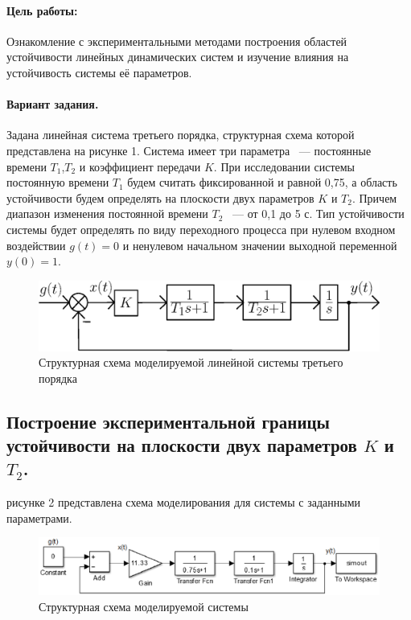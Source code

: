 \documentclass[12pt,a4paper]{article}
\begin{document}


\paragraph{Цель работы:}Ознакомление с экспериментальными методами построения областей устойчивости линейных динамических систем и изучение влияния на устойчивость системы её параметров.%
\paragraph{Вариант задания.} Задана линейная система третьего порядка, структурная схема которой представлена на рисунке 1. Система имеет три параметра ~--- постоянные времени $T_1$,$T_2$ и коэффициент передачи $K$. При исследовании системы постоянную времени $T_1$ будем считать фиксированной и равной 0,75, а область устойчивости будем определять на плоскости двух параметров $K$ и $T_2$. Причем диапазон изменения постоянной времени $T_2$ ~--- от 0,1 до 5 с. Тип устойчивости системы будет определять по виду переходного процесса при нулевом входном воздействии $g(t)=0$ и ненулевом начальном значении выходной переменной $y(0)=1$.
\begin{figure}[h!]
	\centering
	\includegraphics[width=0.8\linewidth]{cxema1.eps}
	\caption{Структурная схема моделируемой линейной системы третьего порядка}
\end{figure} 

\newpage
\begin{center}
    \section{Построение экспериментальной границы устойчивости на плоскости двух параметров $K$ и $T_2$.}
\end{center}
 рисунке 2 представлена схема моделирования для системы с заданными параметрами.
\begin{figure}[h!]
	\centering
	\includegraphics[width=0.9\linewidth]{cxema2.eps}
	\caption{Структурная схема моделируемой системы}
\end{figure}
 
\end{document}
